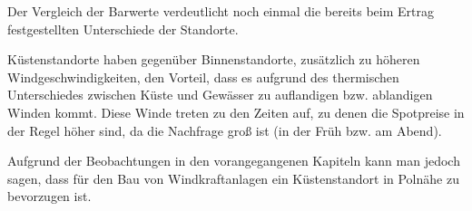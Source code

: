 \documentclass[a4paper,12pt]{article}
\begin{document}
	\noindent Der Vergleich der Barwerte verdeutlicht noch einmal die bereits beim Ertrag festgestellten Unterschiede der Standorte.\\ \par
	\noindent Küstenstandorte haben gegenüber Binnenstandorte, zusätzlich zu höheren Windgeschwindigkeiten, den Vorteil, dass es aufgrund des thermischen Unterschiedes zwischen Küste und Gewässer zu auflandigen bzw. ablandigen Winden kommt. Diese Winde treten zu den Zeiten auf, zu denen die Spotpreise in der Regel höher sind, da die Nachfrage groß ist (in der Früh bzw. am Abend).\\ \par
	\noindent Aufgrund der Beobachtungen in den vorangegangenen Kapiteln kann man jedoch sagen, dass für den Bau von Windkraftanlagen ein Küstenstandort in Polnähe zu bevorzugen ist.
	\newpage
	\listoffigures
	
\end{document}
